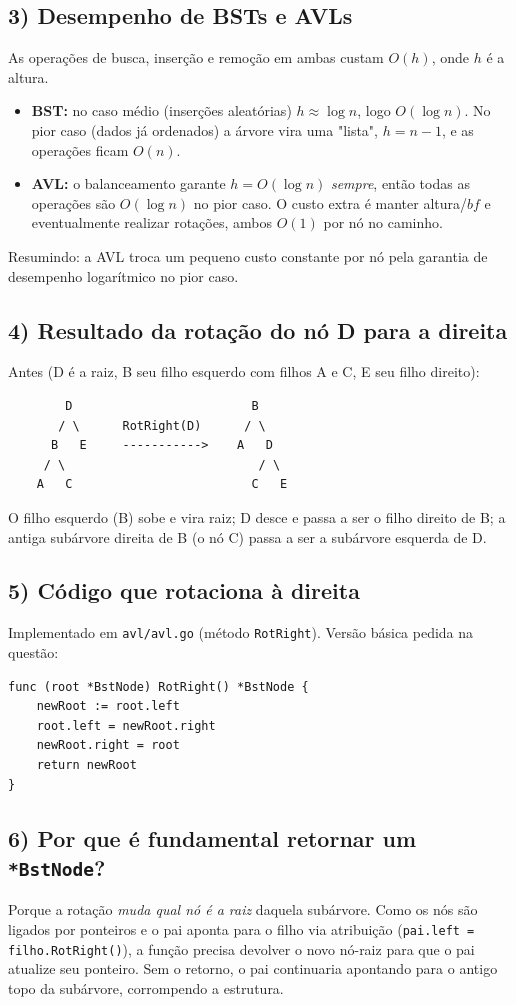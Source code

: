\documentclass[11pt,a4paper]{article}
\begin{document}
\subsection*{3) Desempenho de BSTs e AVLs}
As operações de busca, inserção e remoção em ambas custam $O(h)$, onde $h$ é a altura.
\begin{itemize}[noitemsep]
  \item \textbf{BST:} no caso médio (inserções aleatórias) $h \approx \log n$, logo
        $O(\log n)$. No pior caso (dados já ordenados) a árvore vira uma "lista",
        $h = n-1$, e as operações ficam $O(n)$.
  \item \textbf{AVL:} o balanceamento garante $h = O(\log n)$ \emph{sempre}, então todas as
        operações são $O(\log n)$ no pior caso. O custo extra é manter altura/$bf$ e
        eventualmente realizar rotações, ambos $O(1)$ por nó no caminho.
\end{itemize}
Resumindo: a AVL troca um pequeno custo constante por nó pela garantia de desempenho
logarítmico no pior caso.

\subsection*{4) Resultado da rotação do nó D para a direita}
Antes (D é a raiz, B seu filho esquerdo com filhos A e C, E seu filho direito):
\begin{Verbatim}
        D                         B
       / \      RotRight(D)      / \
      B   E     ----------->    A   D
     / \                           / \
    A   C                         C   E
\end{Verbatim}
O filho esquerdo (B) sobe e vira raiz; D desce e passa a ser o filho direito de B;
a antiga subárvore direita de B (o nó C) passa a ser a subárvore esquerda de D.

\subsection*{5) Código que rotaciona à direita}
Implementado em \texttt{avl/avl.go} (método \texttt{RotRight}). Versão básica pedida na questão:
\begin{lstlisting}
func (root *BstNode) RotRight() *BstNode {
    newRoot := root.left
    root.left = newRoot.right
    newRoot.right = root
    return newRoot
}
\end{lstlisting}

\subsection*{6) Por que é fundamental retornar um \texttt{*BstNode}?}
Porque a rotação \emph{muda qual nó é a raiz} daquela subárvore. Como os nós são ligados por
ponteiros e o pai aponta para o filho via atribuição (\texttt{pai.left = filho.RotRight()}),
a função precisa devolver o novo nó-raiz para que o pai atualize seu ponteiro. Sem o retorno,
o pai continuaria apontando para o antigo topo da subárvore, corrompendo a estrutura.
\end{document}
